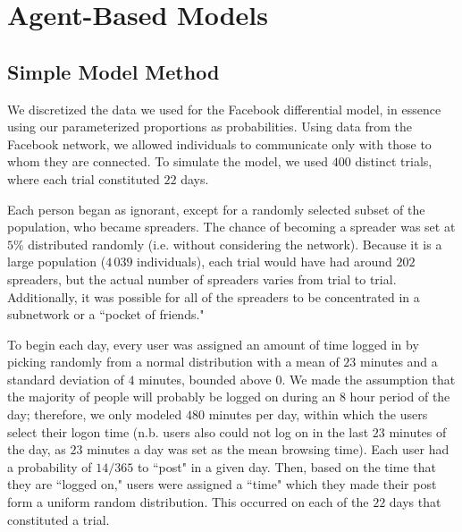 \section{Agent-Based Models }
\label{sec:abmodel}



\subsection{Simple Model Method}
\label{subsec:abmodelsetup}

\noindent We discretized the data we used for the Facebook differential model, in essence using our parameterized proportions as probabilities. Using data from the Facebook network, we allowed individuals to communicate only with those to whom they are connected. To simulate the model, we used $ 400 $ distinct trials, where each trial constituted $ 22 $ days.

Each person began as ignorant, except for a randomly selected subset of the population, who became spreaders. The chance of becoming a spreader was set at $ 5\% $ distributed randomly (i.e. without considering the network). Because it is a large population ($ 4\,039 $ individuals), each trial would have had around $ 202 $ spreaders, but the actual number of spreaders varies from trial to trial. Additionally,  it was possible for all of the spreaders to be concentrated in a subnetwork or a ``pocket of friends."

To begin each day, every user was assigned an amount of time logged in by picking randomly from a normal distribution with a mean of $ 23 $ minutes and a standard deviation of $ 4 $ minutes, bounded above $ 0 $. We made the assumption that the majority of people will probably be logged on during an $8$ hour period of the day; therefore, we only modeled $480$ minutes per day, within which the users select their logon time (n.b. users also could not log on in the last $ 23 $ minutes of the day, as $ 23 $ minutes a day was set as the mean browsing time). Each user had a probability of $14/365$ to ``post" in a given day. Then, based on the time that they are ``logged on," users were assigned a ``time" which they made their post form a uniform random distribution. This occurred on each of the $ 22 $ days that constituted a trial.

